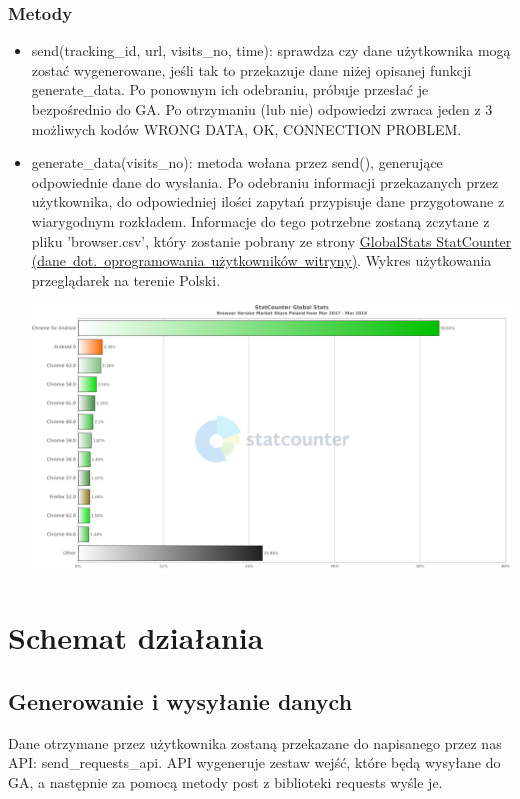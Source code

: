 \documentclass{article}
\begin{document}
\subsubsection{Metody}
\begin{itemize}
\item send(tracking\_id, url, visits\_no, time): sprawdza czy dane użytkownika mogą zostać wygenerowane, jeśli tak to przekazuje dane niżej opisanej funkcji generate\_data. Po ponownym ich odebraniu, próbuje przesłać je bezpośrednio do GA. Po otrzymaniu (lub nie) odpowiedzi zwraca jeden z 3 możliwych kodów {WRONG DATA, OK, CONNECTION PROBLEM}.
\item generate\_data(visits\_no): metoda wołana przez send(), generujące odpowiednie dane do wysłania. Po odebraniu informacji przekazanych przez użytkownika, do odpowiedniej ilości zapytań przypisuje dane przygotowane z wiarygodnym rozkładem. Informacje do tego potrzebne zostaną zczytane z pliku 'browser.csv', który zostanie pobrany ze strony \href{http://gs.statcounter.com/browser-version-market-share/all/poland#monthly-201703-201803-bar}{GlobalStats StatCounter (dane\ dot.\ oprogramowania\ użytkowników\ witryny)}. Wykres użytkowania przeglądarek na terenie Polski.

\includegraphics[scale=0.35]{chart}
\end{itemize}

\section{Schemat działania}

\subsection{Generowanie i wysyłanie danych}
Dane otrzymane przez użytkownika zostaną przekazane do napisanego przez nas API: send\_requests\_api. API wygeneruje zestaw wejść, które będą wysyłane do GA, a następnie za pomocą metody post z biblioteki requests wyśle je. 
\end{document}
